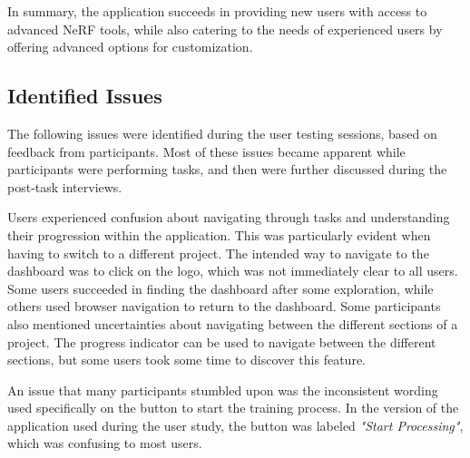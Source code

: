 
In summary, the application succeeds in providing new users with access to advanced NeRF tools, while also catering to the needs of experienced users by offering advanced options for customization.

\subsection*{Identified Issues}
\label{sec:results:issues}

The following issues were identified during the user testing sessions, based on feedback from participants. 
Most of these issues became apparent while participants were performing tasks, and then were further discussed during the post-task interviews.

Users experienced confusion about navigating through tasks and understanding their progression within the application.
This was particularly evident when having to switch to a different project.
The intended way to navigate to the dashboard was to click on the logo, which was not immediately clear to all users.
Some users succeeded in finding the dashboard after some exploration, while others used browser navigation to return to the dashboard.
\cite{P1, P4, P5, P6, P8, P10}
Some participants also mentioned uncertainties about navigating between the different sections of a project.
The progress indicator can be used to navigate between the different sections, but some users took some time to discover this feature.
\cite{P9}



\label{sec:results:issues:inconsistent_wording}
An issue that many participants stumbled upon was the inconsistent wording used specifically on the button to start the training process.
In the version of the application used during the user study, the button was labeled \emph{"Start Processing"}, which was confusing to most users.
\cite{P2, P3, P6, P7, P8}


